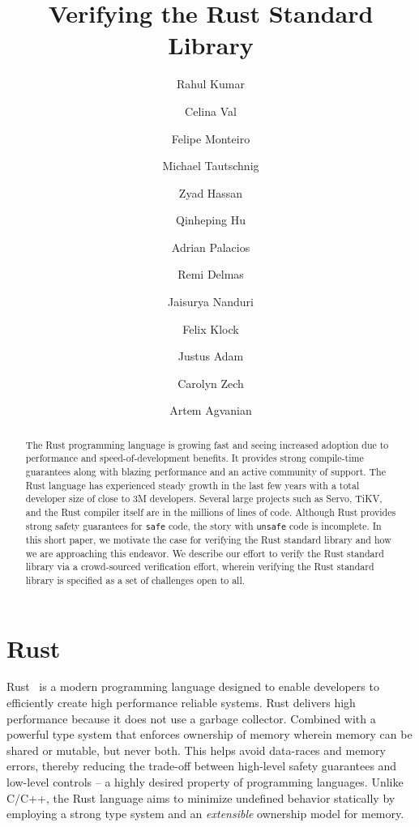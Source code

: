 \documentclass[runningheads]{llncs}
\begin{document}
%
\title{Verifying the Rust Standard Library}

\author{
Rahul Kumar \and 
Celina Val \and
Felipe Monteiro \and
Michael Tautschnig \and
Zyad Hassan \and
Qinheping Hu \and
Adrian Palacios \and
Remi Delmas \and
Jaisurya Nanduri \and
Felix Klock \and
Justus Adam \and
Carolyn Zech \and
Artem Agvanian
}
%


\maketitle

\begin{abstract}
The Rust programming language is growing fast and seeing increased adoption due to performance and speed-of-development benefits. It provides strong compile-time guarantees along with blazing performance and an active community of support. The Rust language has experienced steady growth in the last few years with a total developer size of close to 3M developers. Several large projects such as Servo, TiKV, and the Rust compiler itself are in the millions of lines of code. Although Rust provides strong safety guarantees for \texttt{safe} code, the story with \texttt{unsafe} code is incomplete. In this short paper, we motivate the case for verifying the Rust standard library and how we are approaching this endeavor. We describe our effort to verify the Rust standard library via a crowd-sourced verification effort, wherein verifying the Rust standard library is specified as a set of challenges open to all.

\end{abstract}

\section{Rust}

Rust~\cite{matsakis2014rust} is a modern programming language designed to enable developers to efficiently create high performance reliable systems. Rust delivers high performance because it does not use a garbage collector. Combined with a powerful type system that enforces ownership of memory wherein memory can be shared or mutable, but never both. This helps avoid data-races and memory errors, thereby reducing the trade-off between high-level safety guarantees and low-level controls -- a highly desired property of programming languages. Unlike C/C++, the Rust language aims to minimize undefined behavior statically by employing a strong type system and an \textit{extensible} ownership model for memory. 
\end{document}
